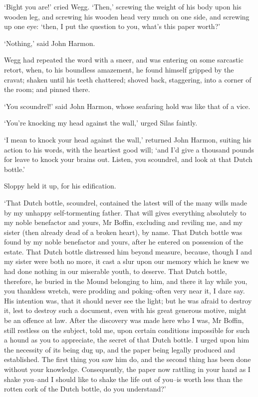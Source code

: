 ‘Bight you are!’ cried Wegg. ‘Then,’ screwing the weight of his body
upon his wooden leg, and screwing his wooden head very much on one side,
and screwing up one eye: ‘then, I put the question to you, what’s this
paper worth?’

‘Nothing,’ said John Harmon.

Wegg had repeated the word with a sneer, and was entering on some
sarcastic retort, when, to his boundless amazement, he found himself
gripped by the cravat; shaken until his teeth chattered; shoved back,
staggering, into a corner of the room; and pinned there.

‘You scoundrel!’ said John Harmon, whose seafaring hold was like that of
a vice.

‘You’re knocking my head against the wall,’ urged Silas faintly.

‘I mean to knock your head against the wall,’ returned John Harmon,
suiting his action to his words, with the heartiest good will; ‘and I’d
give a thousand pounds for leave to knock your brains out. Listen, you
scoundrel, and look at that Dutch bottle.’

Sloppy held it up, for his edification.

‘That Dutch bottle, scoundrel, contained the latest will of the many
wills made by my unhappy self-tormenting father. That will gives
everything absolutely to my noble benefactor and yours, Mr Boffin,
excluding and reviling me, and my sister (then already dead of a broken
heart), by name. That Dutch bottle was found by my noble benefactor and
yours, after he entered on possession of the estate. That Dutch bottle
distressed him beyond measure, because, though I and my sister were
both no more, it cast a slur upon our memory which he knew we had
done nothing in our miserable youth, to deserve. That Dutch bottle,
therefore, he buried in the Mound belonging to him, and there it lay
while you, you thankless wretch, were prodding and poking--often very
near it, I dare say. His intention was, that it should never see the
light; but he was afraid to destroy it, lest to destroy such a document,
even with his great generous motive, might be an offence at law. After
the discovery was made here who I was, Mr Boffin, still restless on the
subject, told me, upon certain conditions impossible for such a hound as
you to appreciate, the secret of that Dutch bottle. I urged upon him the
necessity of its being dug up, and the paper being legally produced and
established. The first thing you saw him do, and the second thing has
been done without your knowledge. Consequently, the paper now rattling
in your hand as I shake you--and I should like to shake the life out
of you--is worth less than the rotten cork of the Dutch bottle, do you
understand?’

